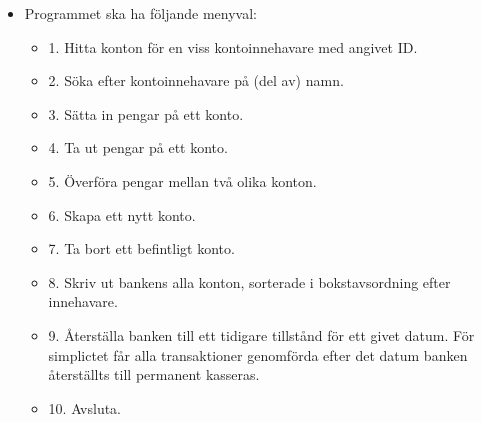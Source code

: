 \begin{itemize}
\item Programmet ska ha följande menyval:

\begin{itemize}
\item 1. Hitta konton för en viss kontoinnehavare med angivet ID.
\item 2. Söka efter kontoinnehavare på (del av) namn.
\item 3. Sätta in pengar på ett konto.
\item 4. Ta ut pengar på ett konto.
\item 5. Överföra pengar mellan två olika konton.
\item 6. Skapa ett nytt konto.
\item 7. Ta bort ett befintligt konto.
\item 8. Skriv ut bankens alla konton, sorterade i bokstavsordning efter innehavare.
\item 9. Återställa banken till ett tidigare tillstånd för ett givet datum. För simplictet får alla transaktioner genomförda efter det datum banken återställts till permanent kasseras. 
\item 10. Avsluta.
\end{itemize}


\end{itemize}
